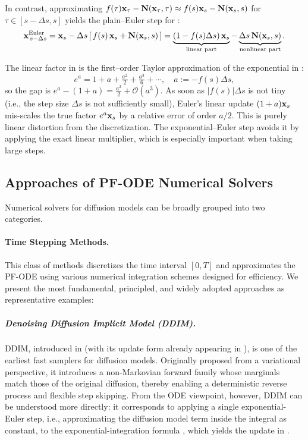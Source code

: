 In contrast, approximating $f(\tau){\mathbf{x}}_\tau - {\mathbf{N}}({\mathbf{x}}_\tau,\tau)\approx f(s){\mathbf{x}}_s - {\mathbf{N}}({\mathbf{x}}_s,s)$ for $\tau\in[s-\Delta s,s]$ yields the plain–Euler step for :
\begin{align}\label{eq:euler-step}
  {\mathbf{x}}^{\mathrm{Euler}}_{\,s-\Delta s}
={\mathbf{x}}_s-\Delta s\,[\,f(s)\,{\mathbf{x}}_s+{\mathbf{N}}({\mathbf{x}}_s,s)\,]
=\underbrace{(1-f(s)\Delta s)\,{\mathbf{x}}_s}_{\text{linear part}}
-\underbrace{\Delta s\,{\mathbf{N}}({\mathbf{x}}_s,s)}_{\text{nonlinear part}}. 
\end{align}

The linear factor in  is the first–order Taylor approximation of the exponential in :
\[
e^{a}=1+a+\tfrac{a^2}{2}+\tfrac{a^3}{6}+\cdots,\quad a:=-f(s)\Delta s,
\]
so the gap is $e^{a}-(1+a)=\tfrac{a^2}{2}+\mathcal O(a^3)$. As soon as $|f(s)|\Delta s$ is not tiny (i.e., the step size $\Delta s$ is not sufficiently small), Euler’s linear update $(1+a){\mathbf{x}}_s$ mis-scales the true factor $e^{a}{\mathbf{x}}_s$ by a relative error of order $a/2$. This is purely linear distortion from the discretization. The exponential–Euler step avoids it by applying the exact linear multiplier, which is especially important when taking large steps.





\subsection{Approaches of PF-ODE Numerical Solvers}
Numerical solvers for diffusion models can be broadly grouped into two categories.

\paragraph{Time Stepping Methods.}  
This class of methods discretizes the time interval $[0,T]$ and approximates the PF-ODE using various numerical integration schemes designed for efficiency. We present the most fundamental, principled, and widely adopted approaches as representative examples:

\subparagraph{Denoising Diffusion Implicit Model (DDIM).} DDIM, introduced in  (with its update form already appearing in ), is one of the earliest fast samplers for diffusion models. Originally proposed from a variational perspective, it introduces a non-Markovian forward family whose marginals match those of the original diffusion, thereby enabling a deterministic reverse process and flexible step skipping. From the ODE viewpoint, however, DDIM can be understood more directly: it corresponds to applying a single exponential-Euler step, i.e., approximating the diffusion model term inside the integral as constant, to the exponential-integration formula , which yields the update in .

